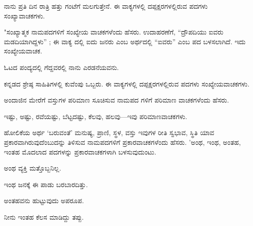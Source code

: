 \vspace{2.5pt plus 3pt minus 0.5pt}\noindent\hspace*{1.2em}\hspace{0.55em}ನಾನು ಪ್ರತಿ ದಿನ ರಾತ್ರಿ ಹತ್ತು ಗಂಟೆಗೆ ಮಲಗುತ್ತೇನೆ. ಈ ವಾಕ್ಯಗಳಲ್ಲಿ ದಪ್ಪಕ್ಷರಗಳಲ್ಲಿರುವ ಪದಗಳು ಸಂಖ್ಯಾವಾಚಕಗಳು.\par

\vspace{4pt plus 4pt minus 1pt}\hspace{0.5em}"ಸಂಖ್ಯಾತ್ಮಕ ನಾಮಪದಗಳಿಗೆ ಸಂಖ್ಯೇಯ ವಾಚಕಗಳೆಂದು ಹೆಸರು. ಉದಾಹರಣೆಗೆ, “ದ್ರೌಪದಿಯು ಐವರು ಮಡದಿಯಾಗಿದ್ದಳು” ; ಈ ವಾಕ್ಯ ದಲ್ಲಿ ಐದು ಜನರು ಎಂಬ ಅರ್ಥದಲ್ಲಿ “ಐವರು” ಎಂಬ ಪದ ಬಳಸಲಾಗಿದೆ. ಇದು ಸಂಖ್ಯೇಯವಾಚಕ.\par

\vspace{2.5pt plus 3pt minus 0.5pt}\noindent\hspace*{1.2em}\hspace{0.55em}ಓಟದ ಪಂದ್ಯದಲ್ಲಿ ಗೆದ್ದವರಲ್ಲಿ ನಾನು ಎರಡನೆಯವನು.\par

\vspace{2.5pt plus 3pt minus 0.5pt}\noindent\hspace*{1.2em}\hspace{0.55em}ಕನ್ನಡದ ಶ್ರೇಷ್ಠ ಸಾಹಿತಿಗಳಲ್ಲಿ ಕುವೆಂಪು ಒಬ್ಬರು. ಈ ವಾಕ್ಯಗಳಲ್ಲಿ ದಪ್ಪಕ್ಷರಗಳಲ್ಲಿರುವ ಪದಗಳು ಸಂಖ್ಯೇಯವಾಚಕಗಳು.\par

\vspace{4pt plus 4pt minus 1pt}\hspace{0.5em}ಅಂದಾಜಿನ ಮೇರೆಗೆ ವಸ್ತುಗಳ ಪರಿಮಾಣ ಸೂಚಿಸುವ ನಾಮಪದ ಗಳಿಗೆ ಪರಿಮಾಣ ವಾಚಕಗಳೆಂದು ಹೆಸರು.\par

\noindent\hspace*{1.2em}\hspace{0.6em}ಇಷ್ಟು, ಅಷ್ಟು, ರವೆಯಷ್ಟು, ಬೆಟ್ಟದಷ್ಟು, ಕೆಲವು, ಹಲವು—ಇವು ಪರಿಮಾಣವಾಚಕಗಳು.\par

\vspace{4pt plus 4pt minus 1pt}\hspace{0.5em}ಹೋಲಿಕೆಯ ಅರ್ಥ `ಬರುವಂತೆ' ಮನುಷ್ಯ, ಪ್ರಾಣಿ, ಸ್ಥಳ, ವಸ್ತು ಇವುಗಳ ರೀತಿ ಸ್ವಭಾವ, ಸ್ಥಿತಿ ಯಾವ ಪ್ರಕಾರವಾಗಿರುವುದೆಂಬುದನ್ನು ತಿಳಿಸುವ ನಾಮಪದಗಳಿಗೆ ಪ್ರಕಾರವಾಚಕಗಳೆಂದು ಹೆಸರು. 'ಅಂಥ, ಇಂಥ, ಅಂತಹ, ಇಂತಹ ಮೊದಲಾದ ಪದಗಳನ್ನು ಪ್ರಕಾರವಾಚಕಗಳಾಗಿ ಬಳಸುವುದುಂಟು.\par

\noindent\hspace*{1.2em}\hspace{0.6em}ಅಂಥ ವ್ಯಕ್ತಿ ಮತ್ತೊಬ್ಬನಿಲ್ಲ.\par

\noindent\hspace*{2.2em}ಇಂಥ ಜನಕ್ಕೆ ಈ ಪಾಡು ಬರಬಾರದಿತ್ತು.\par

\noindent\hspace*{2.2em}ಅಂತಹವನು ಹುಟ್ಟುವುದು ಅಪರೂಪ.\par

\noindent\hspace*{2.2em}ನೀನು ಇಂತಹ ಕೆಲಸ ಮಾಡಿದ್ದು ತಪ್ಪು.\par
